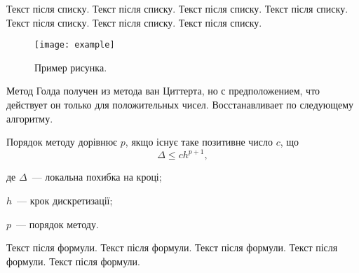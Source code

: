 Текст після списку. Текст після списку. Текст після списку. Текст після списку. Текст після списку. Текст після списку. Текст після списку.

\begin{figure}[h]
  \centering
  \texttt{[image: example]}
  \caption{\label{img:img_example}Пример рисунка.}
\end{figure}

Метод Голда\cite{fstbook} получен из метода ван Циттерта\cite{2book}, но
с предположением, что действует он только для положительных чисел.
Восстанавливает по следующему алгоритму\cite{4book,5book,6book}.

Порядок методу дорівнює $p$, якщо існує таке позитивне число $c$, що
\begin{equation}\label{eq:delta}
  \Delta \le ch^{p+1},
\end{equation}

де ${\Delta}$~--- локальна похибка на кроці;

${h}$~--- крок дискретизації;

${p}$~--- порядок методу.

Текст після формули. Текст після формули. Текст після формули. Текст після формули. Текст після формули.